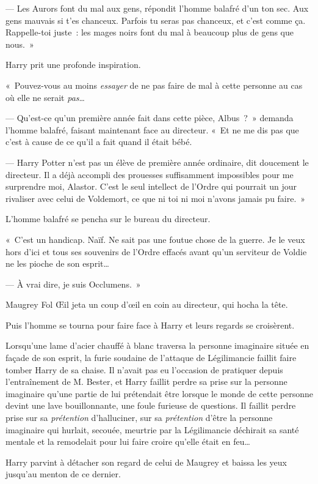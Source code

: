 --- Les Aurors font du mal aux gens, répondit l'homme balafré d'un ton sec. Aux gens mauvais si t'es chanceux. Parfois tu seras pas chanceux, et c'est comme ça. Rappelle-toi juste~: les mages noirs font du mal à beaucoup plus de gens que nous.~»

Harry prit une profonde inspiration.

«~Pouvez-vous au moins \emph{essayer} de ne pas faire de mal à cette personne au cas où elle ne serait \emph{pas}…

--- Qu'est-ce qu'un première année fait dans cette pièce, Albus~?~» demanda l'homme balafré, faisant maintenant face au directeur. «~Et ne me dis pas que c'est à cause de ce qu'il a fait quand il était bébé.

--- Harry Potter n'est pas un élève de première année ordinaire, dit doucement le directeur. Il a déjà accompli des prouesses suffisamment impossibles pour me surprendre moi, Alastor. C'est le seul intellect de l'Ordre qui pourrait un jour rivaliser avec celui de Voldemort, ce que ni toi ni moi n'avons jamais pu faire.~»

L'homme balafré se pencha sur le bureau du directeur.

«~C'est un handicap. Naïf. Ne sait pas une foutue chose de la guerre. Je le veux hors d'ici et tous ses souvenirs de l'Ordre effacés avant qu'un serviteur de Voldie ne les pioche de son esprit…

--- À vrai dire, je suis Occlumens.~»

Maugrey Fol Œil jeta un coup d'œil en coin au directeur, qui hocha la tête.

Puis l'homme se tourna pour faire face à Harry et leurs regards se croisèrent.

Lorsqu'une lame d'acier chauffé à blanc traversa la personne imaginaire située en façade de son esprit, la furie soudaine de l'attaque de Légilimancie faillit faire tomber Harry de sa chaise. Il n'avait pas eu l'occasion de pratiquer depuis l'entraînement de M. Bester, et Harry faillit perdre sa prise sur la personne imaginaire qu'une partie de lui prétendait être lorsque le monde de cette personne devint une lave bouillonnante, une foule furieuse de questions. Il faillit perdre prise sur sa \emph{prétention} d'halluciner, sur sa \emph{prétention} d'être la personne imaginaire qui hurlait, secouée, meurtrie par la Légilimancie déchirait sa santé mentale et la remodelait pour lui faire croire qu'elle était en feu…

Harry parvint à détacher son regard de celui de Maugrey et baissa les yeux jusqu'au menton de ce dernier.

